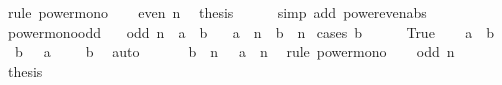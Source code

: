 \begin{isabellebody}
\ {\isacharparenleft}{\kern0pt}rule\ power{\isacharunderscore}{\kern0pt}mono{\isacharparenright}{\kern0pt}\isanewline
\ \ \isamarkupfalse%
\ {\isacartoucheopen}even\ n{\isacartoucheclose}\ \isamarkupfalse%
\ {\isacharquery}{\kern0pt}thesis\isanewline
\ \ \ \ \isamarkupfalse%
\ {\isacharparenleft}{\kern0pt}simp\ add{\isacharcolon}{\kern0pt}\ power{\isacharunderscore}{\kern0pt}even{\isacharunderscore}{\kern0pt}abs{\isacharparenright}{\kern0pt}\isanewline
{}\isamarkupfalse%
%
\endisatagproof
{\isafoldproof}%
%
\isadelimproof
\isanewline
%
\endisadelimproof
\isanewline
{}\isamarkupfalse%
\ power{\isacharunderscore}{\kern0pt}mono{\isacharunderscore}{\kern0pt}odd{\isacharcolon}{\kern0pt}\isanewline
\ \ \ {\isachardoublequoteopen}odd\ n{\isachardoublequoteclose}\ \ {\isachardoublequoteopen}a\ {\isasymle}\ b{\isachardoublequoteclose}\isanewline
\ \ \ {\isachardoublequoteopen}a\ {\isacharcircum}{\kern0pt}\ n\ {\isasymle}\ b\ {\isacharcircum}{\kern0pt}\ n{\isachardoublequoteclose}\isanewline
%
\isadelimproof
%
\endisadelimproof
%
\isatagproof
{}\isamarkupfalse%
\ {\isacharparenleft}{\kern0pt}cases\ {\isachardoublequoteopen}b\ {\isacharless}{\kern0pt}\ {}{\isachardoublequoteclose}{\isacharparenright}{\kern0pt}\isanewline
\ \ \isamarkupfalse%
\ True\isanewline
\ \ \isamarkupfalse%
\ {\isacartoucheopen}a\ {\isasymle}\ b{\isacartoucheclose}\ \isamarkupfalse%
\ {\isachardoublequoteopen}{\isacharminus}{\kern0pt}\ b\ {\isasymle}\ {\isacharminus}{\kern0pt}\ a{\isachardoublequoteclose}\ \ {\isachardoublequoteopen}{}\ {\isasymle}\ {\isacharminus}{\kern0pt}\ b{\isachardoublequoteclose}\ \isamarkupfalse%
\ auto\isanewline
\ \ \isamarkupfalse%
\ \isamarkupfalse%
\ {\isachardoublequoteopen}{\isacharparenleft}{\kern0pt}{\isacharminus}{\kern0pt}\ b{\isacharparenright}{\kern0pt}\ {\isacharcircum}{\kern0pt}\ n\ {\isasymle}\ {\isacharparenleft}{\kern0pt}{\isacharminus}{\kern0pt}\ a{\isacharparenright}{\kern0pt}\ {\isacharcircum}{\kern0pt}\ n{\isachardoublequoteclose}\ \isamarkupfalse%
\ {\isacharparenleft}{\kern0pt}rule\ power{\isacharunderscore}{\kern0pt}mono{\isacharparenright}{\kern0pt}\isanewline
\ \ \isamarkupfalse%
\ {\isacartoucheopen}odd\ n{\isacartoucheclose}\ \isamarkupfalse%
\ {\isacharquery}{\kern0pt}thesis\ \isamarkupfalse%

\end{isabellebody}
